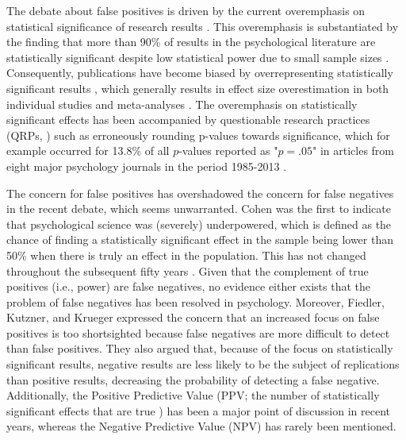 \documentclass{article}
\begin{document}
The debate about false positives is driven by the current overemphasis on statistical significance of research results \cite{Giner-Sorolla2012-wn}. This overemphasis is substantiated by the finding that more than 90\% of results in the psychological literature are statistically significant \cite{Open_Science_Collaboration2015-zs,Sterling1995-fe,Sterling1959-pf} despite low statistical power due to small sample sizes \cite{Cohen1962-jc,Sedlmeier1989-yc,Marszalek2011-rf,Bakker2012-tf}. Consequently, publications have become biased by overrepresenting statistically significant results \cite{Greenwald1975-ck}, which generally results in effect size overestimation in both individual studies \cite{Nuijten2015-od} and meta-analyses \cite{Van_Assen2015-gg,Lane_1978,Rothstein2005-zg,Borenstein2009-vs}. The overemphasis on statistically significant effects has been accompanied by questionable research practices (QRPs, \cite{John2012-uj}) such as erroneously rounding p-values towards significance, which for example occurred for 13.8\% of all $p$-values reported as "$p =.05$" in articles from eight major psychology journals in the period 1985-2013 \cite{Hartgerink2016-mm}.

The concern for false positives has overshadowed the concern for false negatives in the recent debate, which seems unwarranted. Cohen \cite{Cohen1962-jc} was the first to indicate that psychological science was (severely) underpowered, which is defined as the chance of finding a statistically significant effect in the sample being lower than 50\% when there is truly an effect in the population. This has not changed throughout the subsequent fifty years \cite{Bakker2012-tf,Fraley2014-xs}. Given that the complement of true positives (i.e., power) are false negatives, no evidence either exists that the problem of false negatives has been resolved in psychology. Moreover, Fiedler, Kutzner, and Krueger \cite{Fiedler2012-gx} expressed the concern that an increased focus on false positives is too shortsighted because false negatives are more difficult to detect than false positives. They also argued that, because of the focus on statistically significant results, negative results are less likely to be the subject of replications than positive results, decreasing the probability of detecting a false negative. Additionally, the Positive Predictive Value (PPV; the number of statistically significant effects that are true \cite{Ioannidis2005-am}) has been a major point of discussion in recent years, whereas the Negative Predictive Value (NPV) has rarely been mentioned.
\end{document}

